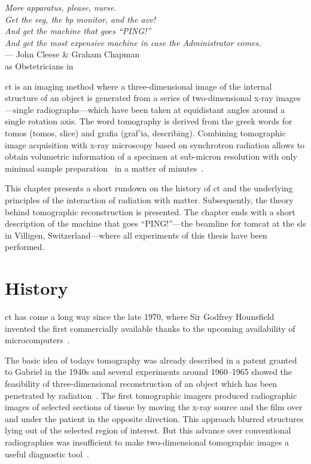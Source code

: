 \acresetall
{}\label{ch:ct}
\begin{flushright}{\slshape More apparatus, please, nurse.\\
				Get the \acs{eeg}, the \acs{bp} monitor, and the \acs{avv}!\\
				And get the machine that goes ``PING!''\\
				And get the most \emph{expensive} machine in case the Administrator comes.} \\ \medskip
	--- John Cleese \& Graham Chapman\\as Obstetricians in \citep{TheMeaningOfLife}
\end{flushright}
\vspace{6cm}

\ac{ct} is an imaging method where a three-dimensional image of the internal structure of an object is generated from a series of two-dimensional x-ray images---single radiographs---which have been taken at equidistant angles around a single rotation axis. The word tomography is derived from the greek words for tomos (\greektext tomos\latintext, slice) and grafia (\greektext graf'ia\latintext, describing). Combining tomographic image acquisition with x-ray microscopy based on synchrotron radiation allows to obtain volumetric information of a specimen at sub-micron resolution with only minimal sample preparation~\cite{Stampanoni2006a} in a matter of minutes~\cite{Hintermueller2010}.

This chapter presents a short rundown on the history of \ac{ct} and the underlying principles of the interaction of radiation with matter. Subsequently, the theory behind tomographic reconstruction is presented. The chapter ends with a short description of the machine that goes ``PING!''---the beamline for \ac{tomcat} at the \ac{sls} in Villigen, Switzerland---where all experiments of this thesis have been performed.

\section{History}
\acl{ct} has come a long way since the late 1970, where Sir Godfrey Hounsfield invented the first commercially available thanks to the upcoming availability of microcomputers~\cite{Hounsfield1976a}.

The basic idea of todays tomography was already described in a patent granted to Gabriel \citet{Frank1942} in the 1940s and several experiments around 1960--1965 showed the feasibility of three-dimensional reconstruction of an object which has been penetrated by radiation~\cite{Hsieh2003}. The first tomographic imagers produced radiographic images of selected sections of tissue by moving the x-ray source and the film over and under the patient in the opposite direction. This approach blurred structures lying out of the selected region of interest. But this advance over conventional radiographies was insufficient to make two-dimensional tomographic images a useful diagnostic tool~\cite{Robb2003}.

